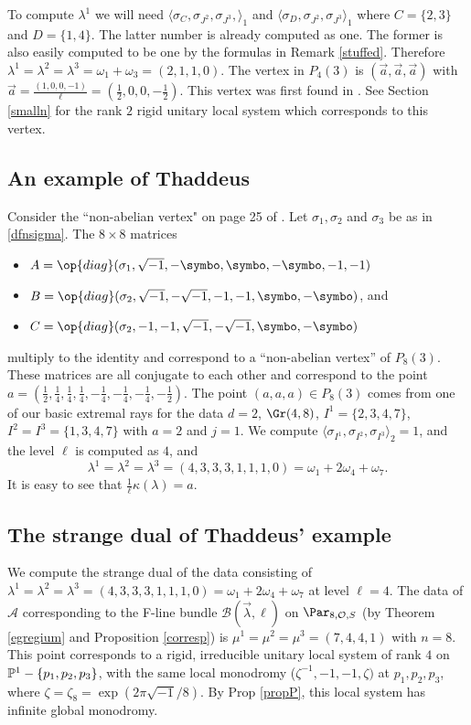 To compute $\lambda^1$ we will need $\langle \sigma_{C},\sigma_{J^2},\sigma_{J^3},\rangle_1$ and  $\langle \sigma_{D},\sigma_{J^2},\sigma_{J^3}\rangle_1$ where $C=\{2,3\}$ and  $D=\{1,4\}$. The latter number is already computed as one. The former is also easily computed to be one by the formulas in Remark \ref{stuffed}.
Therefore $\lambda^1=\lambda^2=\lambda^3= \omega_1+\omega_3=(2,1,1,0)$. The vertex in $P_4(3)$ is $(\vec{a},\vec{a},\vec{a})$ with
$\vec{a} =\frac{(1,0,0,-1)}{\ell}=(\frac{1}{2},0,0,-\frac{1}{2})$. This vertex was first found in \cite[Section 7]{BLocal}. See Section \ref{smalln} for the rank $2$ rigid unitary local system which corresponds to this vertex.



\subsection{An example of Thaddeus}
Consider the ``non-abelian vertex" on page 25 of \cite{thaddy}. Let $\sigma_1,\sigma_2$ and $\sigma_3$ be as in \eqref{dfnsigma}.
The $8\times 8$ matrices
\begin{itemize}
\item $A=\op{diag}(\sigma_1,\sqrt{-1}, -\symbo, \symbo,-\symbo,-1,-1)$
\item $B=\op{diag}(\sigma_2,\sqrt{-1},-\sqrt{-1},-1,-1, \symbo, -\symbo)$, and
\item $C=\op{diag}(\sigma_2,-1,-1,\sqrt{-1},-\sqrt{-1}, \symbo, -\symbo)$
\end{itemize}
multiply to the identity and correspond to a ``non-abelian vertex'' of $P_8(3)$. These matrices are all conjugate to each other and correspond to the point $a=(\frac{1}{2}, \frac{1}{4},\frac{1}{4},\frac{1}{4},-\frac{1}{4},-\frac{1}{4},-\frac{1}{4}, -\frac{1}{2})$. The point $(a,a,a)\in P_8(3)$ comes from one of our basic extremal rays for the data
$d=2$, $\Gr(4,8)$, $I^1=\{2,3,4,7\}$, $I^2=I^3=\{1,3,4,7\}$ with $a=2$ and $j=1$.  We compute
$\langle\sigma_{I^1},\sigma_{I^2},\sigma_{I^3}\rangle_2=1$, and the level $\ell$ is computed as $4$, and
$$\lambda^1=\lambda^2=\lambda^3=(4,3,3,3,1,1,1,0)=\omega_1+2\omega_4+\omega_7.$$ It is easy to see that
$\frac{1}{\ell}\kappa(\lambda)=a$.
\subsection{The strange dual of Thaddeus' example}\label{E1}
We compute the strange dual of the data consisting of $\lambda^1=\lambda^2=\lambda^3=(4,3,3,3,1,1,1,0)=\omega_1+2\omega_4+\omega_7$ at level $\ell=4$.
The data of $\mathcal{A}$ corresponding to the F-line bundle $\mathcal{B}(\vec{\lambda},\ell)$ on
$\Par_{8,\mathcal{O},S}$ (by Theorem \ref{egregium} and Proposition  \ref{corresp}) is $\mu^1=\mu^2=\mu^3=(7,4,4,1)$ with $n=8$.
This point corresponds to a rigid, irreducible unitary local system of rank $4$ on $\Bbb{P}^1-\{p_1,p_2,p_3\}$, with the same local monodromy ($\zeta^{-1},-1,-1,\zeta)$ at $p_1,p_2,p_3$, where
$\zeta=\zeta_8=\exp(2\pi\sqrt{-1}/8)$. By Prop \ref{propP}, this local system has infinite global monodromy.

